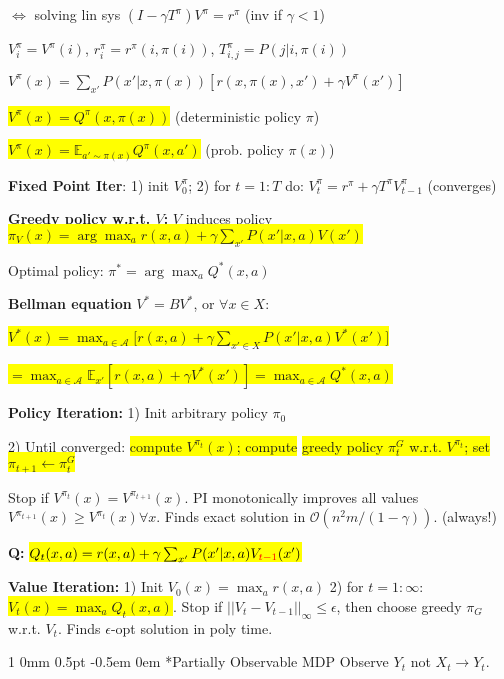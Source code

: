 \documentclass[11pt,landscape,a4paper,fleqn]{article}
\makeatletter
\newcommand*{\rsection}{%
	\@startsection{section}%
	{1}%
	{0mm}%
	{0.5pt}%
	{-0.5em \@plus 0em}
	{\color{myorange}\sffamily\small\bfseries}}
\newcommand{\mhl}[1]{\setlength{\fboxsep}{0pt}\colorbox{yellow}{#1}}
\makeatother
\begin{document}
\begin{multicols*}{4}
$\Leftrightarrow$ solving lin sys $(I - \gamma T^\pi)V^\pi =  r^\pi$ (inv if $\gamma<1$)

$V_i^\pi = V^\pi(i)$, $r_i^\pi = r^\pi(i, \pi(i))$, $T_{i,j}^\pi = P(j | i,\pi(i))$

\vspace*{-1mm}
\mbox{$V^\pi(x) = \sum_{x'} P(x' | x, \pi(x)) [r(x,\pi(x),x') + \gamma V^\pi(x')]$}

\mhl{$V^\pi(x) = Q^\pi(x, \pi(x))$} (deterministic policy $\pi$)

\mhl{$V^\pi(x) = \mathbb{E}_{a' \sim \pi(x)} Q^\pi(x,a')$} (prob. policy $\pi(x)$)

\textbf{Fixed Point Iter}: 1) init $V_0^\pi$; 2) for $t=1:T$ do: $V_t^\pi = r^\pi + \gamma T^\pi V_{t-1}^\pi$ (converges)

\textbf{Greedy policy w.r.t. $V$:} $V$ induces policy\\
\mhl{$\pi_V(x) = \arg\max_a r(x,a) + \gamma \sum_{x'} P(x' | x,a) V(x')$}

Optimal policy: $\pi^* = \arg\max_a Q^*(x,a)$

\textbf{Bellman equation} $V^*=BV^*$, or $\forall x\in X:$

\mhl{$V^*(x) = \max_{a \in \mathcal{A}} \big[ r(x,a) + \gamma \sum_{x' \in X} P(x' | x,a) V^*(x') \big]$}

\mhl{$ = \max_{a \in \mathcal{A}} \mathbb{E}_{x'}[r(x,a) + \gamma V^*(x')] = \max_{a \in \mathcal{A}} Q^*(x,a)$}

\textbf{Policy Iteration:} 1) Init arbitrary policy $\pi_0$

2) Until converged: \mhl{compute $V^{\pi_t}(x)$; compute}
\mhl{greedy policy $\pi_t^G$ w.r.t. $V^{\pi_t}$; set $\pi_{t+1} \leftarrow \pi_t^G$}

Stop if $V^{\pi_t}(x) = V^{\pi_{t+1}}(x)$.  PI monotonically improves all values $V^{\pi_{t+1}}(x) \geq V^{\pi_{t}}(x) \forall x$. Finds exact solution in $\mathcal{O}(n^2 m / (1-\gamma))$. (always!)

\textbf{Q:} \mhl{$Q_t(x,a) = r(x,a) + \gamma \sum_{x'} P(x' | x,a) V_{\textcolor{red}{t-1}}(x')$}

\textbf{Value Iteration:} 1) Init $V_0(x) = \max_a r(x,a)$ 2) for $t = 1:\infty$: \mhl{$V_t(x) = \max_a Q_t(x,a)$}. Stop if $||V_t - V_{t-1}||_\infty \leq \epsilon$, then choose greedy $\pi_G$ w.r.t. $V_t$. Finds $\epsilon$-opt solution in poly time.

\iffalse
\rsection*{Partially Observable MDP}
Observe $Y_t$ not $X_t\rightarrow Y_t$.


\end{multicols*}
\end{document}
